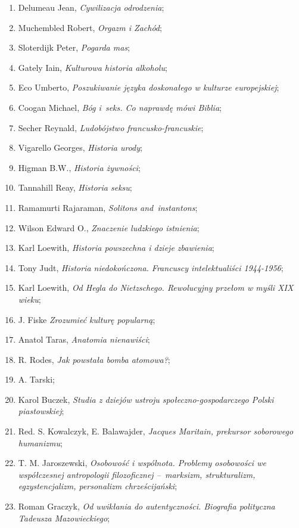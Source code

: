\documentclass[a4paper,11pt]{article}
\begin{document}
\begin{enumerate}
\item Delumeau Jean, \emph{Cywilizacja odrodzenia};
\item Muchembled Robert, \emph{Orgazm i Zachód};
\item Sloterdijk Peter, \emph{Pogarda mas};
\item Gately Iain, \emph{Kulturowa historia alkoholu};
\item Eco Umberto, \emph{Poszukiwanie języka doskonałego w kulturze
    europejskiej};
\item Coogan Michael, \emph{Bóg i~seks. Co naprawdę mówi Biblia};
\item Secher Reynald, \emph{Ludobójstwo francusko-francuskie};
\item Vigarello Georges, \emph{Historia urody};
\item Higman B.W., \emph{Historia żywności};
\item Tannahill Reay, \emph{Historia seksu};
\item Ramamurti Rajaraman, \emph{Solitons and~instantons};
\item Wilson Edward O., \emph{Znaczenie ludzkiego istnienia};
\item Karl Loewith, \emph{Historia powszechna i dzieje zbawienia};
\item Tony Judt, \emph{Historia niedokończona. Francuscy
    intelektualiści 1944-1956};
\item Karl Loewith, \emph{Od Hegla do Nietzschego. Rewolucyjny przełom
    w myśli XIX wieku};
\item J. Fiske \emph{Zrozumieć kulturę popularną};
\item Anatol Taras, \emph{Anatomia nienawiści};
\item R. Rodes, \emph{Jak powstała bomba atomowa?};
\item A. Tarski;
\item Karol Buczek, \emph{Studia z dziejów ustroju
    społeczno-gospodarczego Polski piastowskiej};
\item Red. S. Kowalczyk, E. Balawajder, \emph{Jacques Maritain,
    prekursor soborowego humanizmu};
\item T. M. Jaroszewski, \emph{Osobowość i wspólnota. Problemy
    osobowości we współczesnej antropologii filozoficznej --~marksizm,
    strukturalizm, egzystencjalizm, personalizm chrześcijański};
\item Roman Graczyk, \emph{Od uwikłania do autentyczności. Biografia
    polityczna Tadeusza Mazowieckiego};

\end{enumerate}
\end{document}
